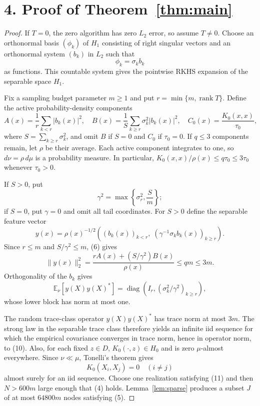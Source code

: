 \documentclass[10pt]{article}
\newcommand{\diag}{\operatorname{diag}}
\begin{document}
\section*{4. Proof of Theorem~\ref{thm:main}}
\begin{proof}
If $T=0$, the zero algorithm has zero $L_2$ error, so assume $T\neq0$.
Choose an orthonormal basis $(\phi_k)$ of $H_1$ consisting of right singular
vectors and an orthonormal system $(b_k)$ in $L_2$ such that
\[
 \phi_k=\sigma_k b_k
\]
as functions.  This countable system gives the pointwise RKHS expansion of
the separable space $H_1$.

Fix a sampling budget parameter $m\geq1$ and put
$r=\min\{m,\operatorname{rank}T\}$.  Define the active probability-density
components
\[
 A(x)=\frac1r\sum_{k<r}|b_k(x)|^2,
 \quad
 B(x)=\frac1S\sum_{k\geq r}\sigma_k^2|b_k(x)|^2,
 \quad
 C_0(x)=\frac{K_0(x,x)}{\tau_0},                              \tag{6}
\]
where $S=\sum_{k\geq r}\sigma_k^2$, and omit $B$ if $S=0$ and $C_0$ if
$\tau_0=0$.  If $q\leq3$ components remain, let $\rho$ be their average.
Each active component integrates to one, so $d\nu=\rho\,d\mu$ is a
probability measure.  In particular,
$K_0(x,x)/\rho(x)\leq q\tau_0\leq3\tau_0$ whenever $\tau_0>0$.

If $S>0$, put
\[
 \gamma^2=\max\left\{\sigma_r^2,\frac Sm\right\};             \tag{7}
\]
if $S=0$, put $\gamma=0$ and omit all tail coordinates.  For $S>0$ define
the separable feature vector
\[
 y(x)=\rho(x)^{-1/2}
 \left((b_k(x))_{k<r},\;(\gamma^{-1}\sigma_kb_k(x))_{k\geq r}\right).
                                                                    \tag{8}
\]
Since $r\leq m$ and $S/\gamma^2\leq m$, (6) gives
\[
 \|y(x)\|_2^2
 =\frac{rA(x)+(S/\gamma^2)B(x)}{\rho(x)}\leq qm\leq3m.       \tag{9}
\]
Orthogonality of the $b_k$ gives
\[
 \mathbb E_\nu[y(X)y(X)^*]
 =\diag\left(I_r,(\sigma_k^2/\gamma^2)_{k\geq r}\right),     \tag{10}
\]
whose lower block has norm at most one.

The random trace-class operator $y(X)y(X)^*$ has trace norm at most $3m$.
The strong law in the separable trace class therefore yields an infinite iid
sequence for which the empirical covariance converges in trace norm, hence
in operator norm, to (10).  Also, for each fixed $z\in D$,
$K_0(\cdot,z)\in H_0$ and is zero $\mu$-almost everywhere.  Since
$\nu\ll\mu$, Tonelli's theorem gives
\[
 K_0(X_i,X_j)=0\quad(i\neq j)                                \tag{11}
\]
almost surely for an iid sequence.  Choose one realization satisfying (11)
and then $N>600m$ large enough that (4) holds.  Lemma~\ref{lem:sparse}
produces a subset $J$ of at most $64800m$ nodes satisfying (5).


\end{proof}
\end{document}
